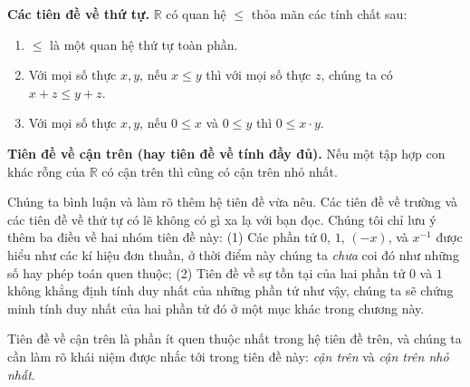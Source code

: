\begin{axiom}
    \textbf{Các tiên đề về thứ tự.} $\mathbb{R}$ có quan hệ $\leq$ thỏa mãn các tính chất sau:
    \begin{enumerate}[label={(\roman*)}]
        \item $\leq$ là một quan hệ thứ tự toàn phần.
        \item Với mọi số thực $x, y$, nếu $x\leq y$ thì với mọi số thực $z$, chúng ta có $x + z\leq y + z$.
        \item Với mọi số thực $x, y$, nếu $0\leq x$ và $0\leq y$ thì $0\leq x\cdot y$.
    \end{enumerate}

    \textbf{Tiên đề về cận trên (hay tiên đề về tính đầy đủ).} Nếu một tập hợp con khác rỗng của $\mathbb{R}$ có cận trên thì cũng có cận trên nhỏ nhất.
\end{axiom}

Chúng ta bình luận và làm rõ thêm hệ tiên đề vừa nêu. Các tiên đề về trường và các tiên đề về thứ tự có lẽ không có gì xa lạ với bạn đọc. Chúng tôi chỉ lưu ý thêm ba điều về hai nhóm tiên đề này: (1) Các phần tử $0$, $1$, $(-x)$, và $x^{-1}$ được hiểu như các kí hiệu đơn thuần, ở thời điểm này chúng ta \textit{chưa} coi đó như những số hay phép toán quen thuộc; (2) Tiên đề về sự tồn tại của hai phần tử $0$ và $1$ không khẳng định tính duy nhất của những phần tử như vậy, chúng ta sẽ chứng minh tính duy nhất của hai phần tử đó ở một mục khác trong chương này.

Tiên đề về cận trên là phần ít quen thuộc nhất trong hệ tiên đề trên, và chúng ta cần làm rõ khái niệm được nhắc tới trong tiên đề này: \textit{cận trên} và \textit{cận trên nhỏ nhất}.

